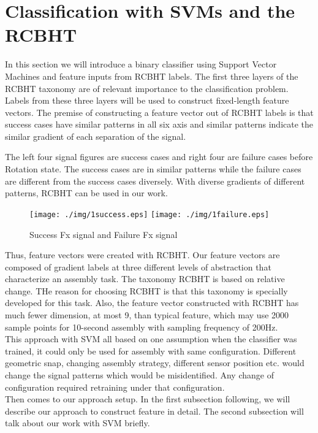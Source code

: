 %

\chapter{Classification with SVMs and the RCBHT}
In this section we will introduce a binary classifier using Support Vector Machines and feature inputs from RCBHT labels. The first three layers of the RCBHT taxonomy are of relevant importance to the classification problem. Labels from these three layers will be used to construct fixed-length feature vectors. The premise of constructing a feature vector out of RCBHT labels is that success cases have similar patterns in all six axis and similar patterns indicate the similar gradient of each separation of the signal.

\indent The left four signal figures are success cases and right four are failure cases before Rotation state. The success cases are in similar patterns while the failure cases are different from the success cases diversely. With diverse gradients of different patterns, RCBHT can be used in our work.

\begin{figure}[h]
    \centering
    \texttt{[image: ./img/1success.eps]}
    \texttt{[image: ./img/1failure.eps]}
    \caption{Success Fx signal and Failure Fx signal}
    \label{sfsignal}
\end{figure}


\indent Thus, feature vectors were created with RCBHT. Our feature vectors are composed of gradient labels at three different levels of abstraction that characterize an assembly task. The taxonomy RCBHT is based on relative change. THe reason for choosing RCBHT is that this taxonomy is specially developed for this task. Also, the feature vector constructed with RCBHT has much fewer dimension, at most 9, than typical feature, which may use 2000 sample points for 10-second assembly with sampling frequency of 200Hz. \\
\indent This approach with SVM all based on one assumption when the classifier was trained, it could only be used for assembly with same configuration. Different geometric snap, changing assembly strategy, different sensor position etc. would change the signal patterns which would be misidentified. Any change of configuration required retraining under that configuration. \\
\indent Then comes to our approach setup. In the first subsection following, we will describe our approach to construct feature in detail. The second subsection will talk about our work with SVM briefly. 
